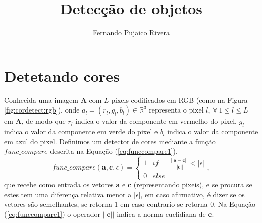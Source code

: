\documentclass[12pt]{article}
\title{Detecção de objetos }
\author{Fernando Pujaico Rivera}
\date{}
\begin{document}
\maketitle


\section{Detetando cores}
Conhecida uma imagem $\textbf{A}$ com $L$ pixels codificados 
em RGB (como na Figura \ref{fig:cordetect:rgb}), onde $a_l=(r_l,g_l,b_l)\in \mathbb{R}^3$
representa o pixel $l$, $\forall~1\leq l\leq L$ em $\textbf{A}$, 
de modo que
$r_l$ indica o valor da componente em vermelho do pixel,
$g_l$ indica o valor da componente em verde do pixel e
$b_l$ indica o valor da componente em azul do pixel.
Definimos um detector de cores mediante a função $func\_compare$ descrita na Equação (\ref{eq:funccompare1}),
\begin{equation}\label{eq:funccompare1}
func\_compare(\mathbf{a},\mathbf{c},\epsilon)=
\left\{
\begin{matrix}
1 & if   & \frac{||\mathbf{a}-\mathbf{c}||}{||\mathbf{c}||}<|\epsilon|\\
0 & else & ~
\end{matrix}
\right.,
\end{equation}
que recebe como entrada os vetores $\mathbf{a}$ e $\mathbf{c}$ 
(representando pixeis), e se procura se estes tem uma diferença relativa menor a $|\epsilon|$, 
em caso afirmativo, é dizer se os vetores são semelhantes, se retorna $1$ em caso contrario se retorna $0$.
Na Equação (\ref{eq:funccompare1}) o operador $||\mathbf{c}||$ indica a norma euclidiana de $\mathbf{c}$.
\end{document}
